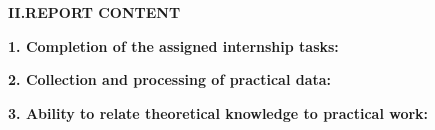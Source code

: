 \documentclass[13pt,a4paper]{extreport}
\begin{document}
{\vspace{0.25cm}

\noindent
{\bfseries II.\quad REPORT CONTENT}

\vspace{0.35cm}

\noindent
\textbf{1. Completion of the assigned internship tasks:}

\evaltwolines

\noindent
\textbf{2. Collection and processing of practical data:}

\evaltwolines

\noindent
\textbf{3. Ability to relate theoretical knowledge to practical work:}

\evaltwolines

} %



\clearpage
\thispagestyle{empty}
\end{document}
